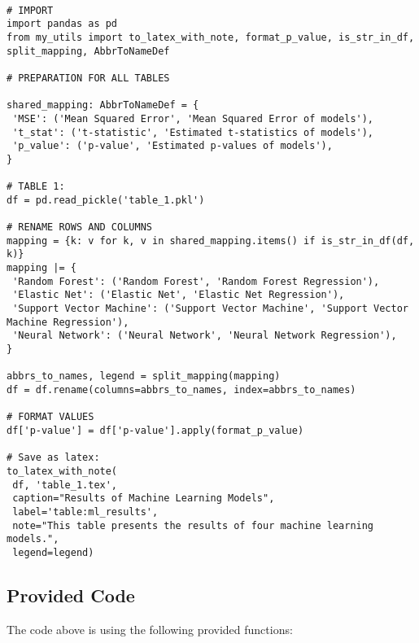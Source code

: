\documentclass[11pt]{article}
\begin{document}
\begin{verbatim}

# IMPORT
import pandas as pd
from my_utils import to_latex_with_note, format_p_value, is_str_in_df, split_mapping, AbbrToNameDef

# PREPARATION FOR ALL TABLES

shared_mapping: AbbrToNameDef = {
 'MSE': ('Mean Squared Error', 'Mean Squared Error of models'),
 't_stat': ('t-statistic', 'Estimated t-statistics of models'),
 'p_value': ('p-value', 'Estimated p-values of models'),
}

# TABLE 1:
df = pd.read_pickle('table_1.pkl')

# RENAME ROWS AND COLUMNS
mapping = {k: v for k, v in shared_mapping.items() if is_str_in_df(df, k)} 
mapping |= {
 'Random Forest': ('Random Forest', 'Random Forest Regression'),
 'Elastic Net': ('Elastic Net', 'Elastic Net Regression'),
 'Support Vector Machine': ('Support Vector Machine', 'Support Vector Machine Regression'),
 'Neural Network': ('Neural Network', 'Neural Network Regression'),
}

abbrs_to_names, legend = split_mapping(mapping)
df = df.rename(columns=abbrs_to_names, index=abbrs_to_names)

# FORMAT VALUES 
df['p-value'] = df['p-value'].apply(format_p_value)

# Save as latex:
to_latex_with_note(
 df, 'table_1.tex',
 caption="Results of Machine Learning Models", 
 label='table:ml_results',
 note="This table presents the results of four machine learning models.",
 legend=legend)

\end{verbatim}

\subsection{Provided Code}
The code above is using the following provided functions:
\end{document}
